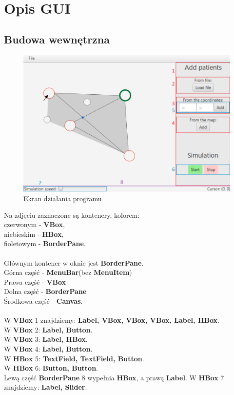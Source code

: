 \documentclass[]{article}
\begin{document}
    
    \section{Opis GUI}
        \subsection{Budowa wewnętrzna}
            \begin{figure}[!h]
                \centering
                \includegraphics[width=\textwidth]{gui-impl.png}
                \caption{Ekran działania programu}
                \label{fig:GUI}
            \end{figure}
            
            Na zdjęciu zaznaczone są kontenery, kolorem:\\
                czerwonym - \textbf{VBox},\\
                niebieskim - \textbf{HBox},\\
                fioletowym - \textbf{BorderPane}.\\
            \\
            Głównym kontener w oknie jest \textbf{BorderPane}.\\
            Górna część - \textbf{MenuBar}(bez \textbf{MenuItem})\\
            Prawa część - \textbf{VBox}\\
            Dolna część - \textbf{BorderPane}\\
            Środkowa część - \textbf{Canvas}.\\
            \\
            W \textbf{VBox} 1 znajdziemy: \textbf{Label, VBox, VBox, VBox, Label, HBox}.\\
            W \textbf{VBox} 2: \textbf{Label, Button}.\\
            W \textbf{VBox} 3: \textbf{Label, HBox}.\\
            W \textbf{VBox} 4: \textbf{Label, Button}.\\
            W \textbf{HBox} 5: \textbf{TextField, TextField, Button}.\\
            W \textbf{HBox} 6: \textbf{Button, Button}.\\
            Lewą część \textbf{BorderPane} 8 wypełnia \textbf{HBox}, a prawą \textbf{Label}.
            W \textbf{HBox} 7 znajdziemy: \textbf{Label, Slider}.
            
\end{document}
